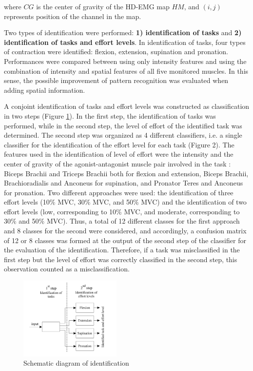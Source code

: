 where $CG$ is the center of gravity of the HD-EMG map $HM$, and $(i,j)$ represents position of the channel in the map.

Two types of identification were performed: \textbf{1) identification of tasks} and \textbf{2) identification of tasks and effort levels}. In identification of tasks, four types of contraction were identified: flexion, extension, supination and pronation. Performances were compared between using only intensity features and using the combination of intensity and spatial features of all five monitored muscles. In this sense, the possible improvement of pattern recognition was evaluated when adding spatial information. 

A conjoint identification of tasks and effort levels was constructed as classification in two steps \citep{Rojas-Martinez2013} (Figure \ref{fig:2-2}). In the first step, the identification of tasks was performed, while in the second step, the level of effort of the identified task was determined. The second step was organized as 4 different classifiers, i.e. a single classifier for the identification of the effort level for each task (Figure 2). The features used in the identification of level of effort were the intensity and the center of gravity of the agonist-antagonist muscle pair involved in the task \citep{Rojas-Martinez2013}: Biceps Brachii and Triceps Brachii both for flexion and extension, Biceps Brachii, Brachioradialis and Anconeus for supination, and Pronator Teres and Anconeus for pronation. Two different approaches were used: the identification of three effort levels (10\% MVC, 30\% MVC, and 50\% MVC) and the identification of two effort levels (low, corresponding to 10\% MVC, and moderate, corresponding to 30\% and 50\% MVC). Thus, a total of 12 different classes for the first approach and 8 classes for the second were considered, and accordingly, a confusion matrix of 12 or 8 classes was formed at the output of the second step of the classifier for the evaluation of the identification. Therefore, if a task was misclassified in the first step but the level of effort was correctly classified in the second step, this observation counted as a misclassification.

\begin{figure}[ht]
\centering
\includegraphics[width=0.45\textwidth]{Images/figure2_2.png}
\caption{Schematic diagram of identification}
\label{fig:2-2}
\end{figure}     

